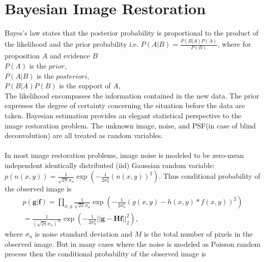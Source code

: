\documentclass[a4paper]{book}
\begin{document}
\section{\Large Bayesian Image Restoration} \label{BIR}
Bayes’s law states that the posterior probability is proportional to the product of the
likelihood and the prior probability i.e. $ P(A|B) = \frac{P(B|A)P(A)}{P(B)} $, where for proposition $ A $ and evidence $ B $\\
$ P(A) $ is the $ prior $, \\
$ P(A|B) $ is the $ posteriori $,  \\
$ P(B|A)P(B) $ is the support of $ A $, \\ 
The likelihood encompasses the information contained in the new
data. The prior expresses the degree of certainty concerning the situation before the data are taken. Bayesian estimation provides an elegant statistical perspective to the image restoration problem. The unknown image, noise, and PSF(in case of blind deconvolution) are all treated as random variables. 

\paragraph*{} In most image restoration problems, image noise is modeled to be zero-mean independent identically distributed (iid) Gaussian random variable: $ p(n(x,y)) = \frac{1}{\sqrt{2\pi}\sigma_{n}}\exp\left(-\frac{1}{2\sigma_{n}^{2}}(n(x,y))^{2}\right)$. Thus conditional probability of the observed image is 
\begin{equation}
\begin{multlined}
	\label{eq3.12}
	p(\textbf{g}|\textbf{f}) = \prod_{x,y}\frac{1}{\sqrt{2\pi}\sigma_{n}}\exp\left(-\frac{1}{2\sigma_{n}^{2}}(g(x,y)-h(x,y)*f(x,y))^{2}\right) \\
	= \frac{1}{\left(\sqrt{2\pi}\sigma_{n}\right)^{M}}
		\exp\left(-\frac{1}{2\sigma_{n}^{2}} ||\textbf{g} - \textbf{Hf}||^{2}_{2} \right),
\end{multlined}
\end{equation}
where $ \sigma_{n} $ is noise standard deviation and $ M $ is the total number of pixels in the observed image.
But in many cases where the noise is modeled as Poisson random process then the conditional probability of the observed image is 
\end{document}

